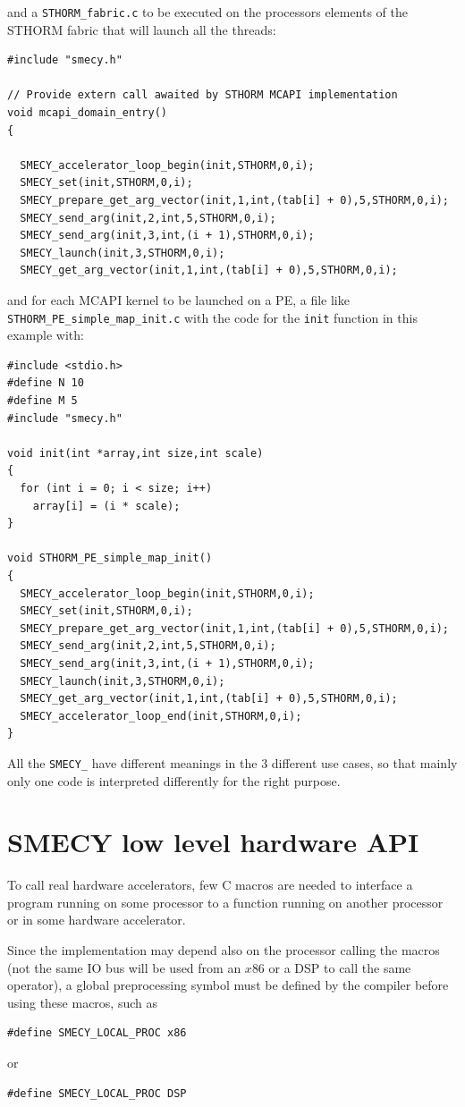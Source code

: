 \documentclass[a4paper]{article}
\begin{document}
and a \verb|STHORM_fabric.c| to be executed on the processors elements
of the STHORM fabric that will launch all the threads:
\begin{lstlisting}
#include "smecy.h"

// Provide extern call awaited by STHORM MCAPI implementation
void mcapi_domain_entry()
{

  SMECY_accelerator_loop_begin(init,STHORM,0,i);
  SMECY_set(init,STHORM,0,i);
  SMECY_prepare_get_arg_vector(init,1,int,(tab[i] + 0),5,STHORM,0,i);
  SMECY_send_arg(init,2,int,5,STHORM,0,i);
  SMECY_send_arg(init,3,int,(i + 1),STHORM,0,i);
  SMECY_launch(init,3,STHORM,0,i);
  SMECY_get_arg_vector(init,1,int,(tab[i] + 0),5,STHORM,0,i);
\end{lstlisting}
and for each MCAPI kernel to be launched on a PE, a file like
\verb|STHORM_PE_simple_map_init.c| with the code for the \verb|init|
function in this example with:
\begin{lstlisting}
#include <stdio.h>
#define N 10
#define M 5
#include "smecy.h"

void init(int *array,int size,int scale)
{
  for (int i = 0; i < size; i++)
    array[i] = (i * scale);
}

void STHORM_PE_simple_map_init()
{
  SMECY_accelerator_loop_begin(init,STHORM,0,i);
  SMECY_set(init,STHORM,0,i);
  SMECY_prepare_get_arg_vector(init,1,int,(tab[i] + 0),5,STHORM,0,i);
  SMECY_send_arg(init,2,int,5,STHORM,0,i);
  SMECY_send_arg(init,3,int,(i + 1),STHORM,0,i);
  SMECY_launch(init,3,STHORM,0,i);
  SMECY_get_arg_vector(init,1,int,(tab[i] + 0),5,STHORM,0,i);
  SMECY_accelerator_loop_end(init,STHORM,0,i);
}
\end{lstlisting}
All the \verb|SMECY_| have different meanings in the 3 different use
cases, so that mainly only one code is interpreted differently for the
right purpose.


\section{SMECY low level hardware API}
\label{sec:low-level-hardware}

To call real hardware accelerators, few C macros are needed to interface a
program running on some processor to a function running on another
processor or in some hardware accelerator.

Since the implementation may depend also on the processor calling the
macros (not the same IO bus will be used from an $x$86 or a DSP to call
the same operator), a global preprocessing symbol must be defined by the
compiler before using these macros, such as
\begin{lstlisting}
#define SMECY_LOCAL_PROC x86
\end{lstlisting}
or
\begin{lstlisting}
#define SMECY_LOCAL_PROC DSP
\end{lstlisting}
\end{document}
